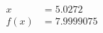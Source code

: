 \documentclass[preview]{standalone}
\begin{document}
\begin{align*}
x &= 5.0272\\f(x) &= 7.9999075
\end{align*}
\end{document}
